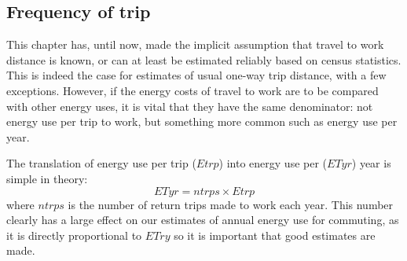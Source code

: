 \subsection{Frequency of trip} \label{sfreq}
This chapter has, until now, made the implicit assumption that
travel to work distance is known, or can at least be estimated reliably based on
census statistics. This is indeed the case for estimates of usual one-way trip
distance, with a few exceptions. However, if the energy costs of travel to work
are to be compared with other energy uses, it is vital that they have the same
denominator: not energy use per trip to work, but something more common such as
energy use per year.

The translation of energy use per trip ($Etrp$) into energy use per ($ETyr$)
year is simple in theory:
\begin{equation}
 ETyr = ntrps \times Etrp
\end{equation}
where $ntrps$ is the number of return trips made to work each year. This number
clearly has a large effect on our estimates of annual energy use for commuting,
as it is directly proportional to $ETry$ so it is important that good estimates
are made.

